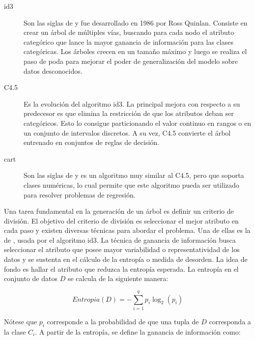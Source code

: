 \begin{description}

	\item[\acrshort{id3}] Son las siglas de  y
	      fue desarrollado en 1986 por Ross Quinlan. Consiste en crear un árbol de
	      múltiples vías, buscando para cada nodo el atributo categórico que lance
	      la mayor ganancia de información para las clases categóricas. Los árboles
	      crecen en un tamaño máximo y luego se realiza el paso de poda para mejorar
	      el poder de generalización del modelo sobre datos desconocidos.

	\item[C4.5] Es la evolución del algoritmo \acrshort{id3}. La principal mejora
	      con respecto a su predecesor es que elimina la restricción de que los
	      atributos deban ser categóricos. Esto lo consigue particionando el valor
	      continuo en rangos o en un conjunto de intervalos discretos. A su vez,
	      C4.5 convierte el árbol entrenado en conjuntos de reglas de decisión.

	\item[\acrshort{cart}] Son las siglas de  y
	      es un algoritmo muy similar al C4.5, pero que soporta clases numéricas, lo
	      cual permite que este algoritmo pueda ser utilizado para resolver
	      problemas de regresión.

\end{description}

Una tarea fundamental en la generación de un árbol es definir un criterio de
división. El objetivo del criterio de división es seleccionar el mejor atributo
en cada paso y existen diversas técnicas para abordar el problema. Una de ellas
es la de , usada por el algoritmo
\acrshort{id3}. La técnica de ganancia de información busca seleccionar el
atributo que posee mayor variabilidad o representatividad de los datos y se
sustenta en el cálculo de la entropía o medida de desorden. La idea de fondo es
hallar el atributo que reduzca la entropía esperada. La entropía en el conjunto
de datos $D$ se calcula de la siguiente manera:

\begin{equation}
	Entropia(D) = - \sum_{i=1}^{q} p_{i}\log_{2}(p_{i})
\end{equation}

Nótese que $p_{i}$ corresponde a la probabilidad de que una tupla de $D$
corresponda a la clase $C_{i}$.  A partir de la entropía, se define la ganancia
de información como:

